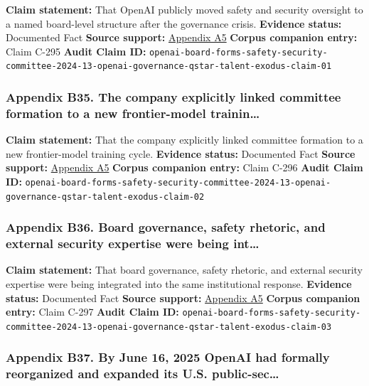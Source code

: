 \documentclass[
  american,
  11pt,
  letterpaper,
]{article}
\begin{document}
\textbf{Claim statement:} That OpenAI publicly moved safety and security
oversight to a named board-level structure after the governance crisis.
\textbf{Evidence status:} Documented Fact \textbf{Source support:}
\hyperref[ch-08-appendix-a5-openai-board-forms-safety-and-security-committee]{Appendix
A5} \textbf{Corpus companion entry:} Claim C-295 \textbf{Audit Claim
ID:}
\texttt{openai-board-forms-safety-security-committee-2024-13-openai-governance-qstar-talent-exodus-claim-01}

\subsubsection{Appendix B35. The company explicitly linked committee
formation to a new frontier-model
trainin\ldots{}}\label{ch-08-appendix-b35-the-company-explicitly-linked-committee-formation-to-a-new-frontier-model-trainin}

\textbf{Claim statement:} That the company explicitly linked committee
formation to a new frontier-model training cycle. \textbf{Evidence
status:} Documented Fact \textbf{Source support:}
\hyperref[ch-08-appendix-a5-openai-board-forms-safety-and-security-committee]{Appendix
A5} \textbf{Corpus companion entry:} Claim C-296 \textbf{Audit Claim
ID:}
\texttt{openai-board-forms-safety-security-committee-2024-13-openai-governance-qstar-talent-exodus-claim-02}

\subsubsection{Appendix B36. Board governance, safety rhetoric, and
external security expertise were being
int\ldots{}}\label{ch-08-appendix-b36-board-governance-safety-rhetoric-and-external-security-expertise-were-being-int}

\textbf{Claim statement:} That board governance, safety rhetoric, and
external security expertise were being integrated into the same
institutional response. \textbf{Evidence status:} Documented Fact
\textbf{Source support:}
\hyperref[ch-08-appendix-a5-openai-board-forms-safety-and-security-committee]{Appendix
A5} \textbf{Corpus companion entry:} Claim C-297 \textbf{Audit Claim
ID:}
\texttt{openai-board-forms-safety-security-committee-2024-13-openai-governance-qstar-talent-exodus-claim-03}

\subsubsection{Appendix B37. By June 16, 2025 OpenAI had formally
reorganized and expanded its U.S.
public-sec\ldots{}}\label{ch-08-appendix-b37-by-june-16-2025-openai-had-formally-reorganized-and-expanded-its-u-s-public-sec}
\end{document}
